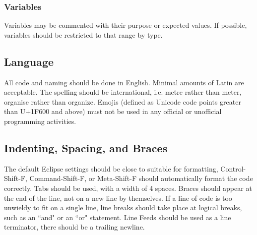 \documentclass[]{report}
\begin{document}
\subsubsection{Variables}
Variables may be commented with their purpose or expected values.
If possible, variables should be restricted to that range by type.

\subsection{Language}
All code and naming should be done in English.
Minimal amounts of Latin are acceptable.
The spelling should be international, i.e. metre rather than meter, organise rather than organize.
Emojis (defined as Unicode code points greater than U+1F600 and above) must not be used in any official or unofficial programming activities.

\subsection{Indenting, Spacing, and Braces}
The default Eclipse settings should be close to suitable for formatting, Control-Shift-F, Command-Shift-F, or Meta-Shift-F should automatically format the code correctly.
Tabs should be used, with a width of 4 spaces.
Braces should appear at the end of the line, not on a new line by themselves.
If a line of code is too unwieldy to fit on a single line, line breaks should take place at logical breaks, such as an ``and" or an ``or" statement.
Line Feeds should be used as a line terminator, there should be a trailing newline.
\end{document}
